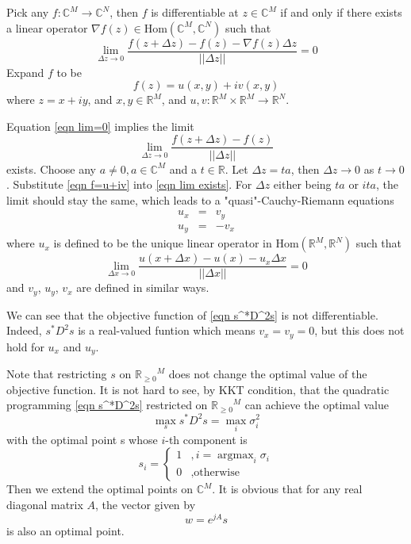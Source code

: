 \documentclass[12pt]{article}
\theoremstyle{remark}
\DeclareMathOperator*{\argmax}{argmax}
\begin{document}
Pick any $f:\mathbb{C}^M\rightarrow\mathbb{C}^N$, then $f$ is differentiable at $z\in\mathbb{C}^M$ if and only if there exists a linear operator $\nabla f(z)\in\mbox{Hom}\left(\mathbb{C}^M,\mathbb{C}^N \right)$ such that
\begin{equation}
	\lim_{\Delta z\rightarrow0}\frac{f(z+\Delta z)-f(z)-\nabla f(z)\Delta z}{||\Delta z||}=0\label{eqn lim=0}
\end{equation}
Expand $f$ to be 
\begin{equation}
	f(z)=u(x,y)+iv(x,y)\label{eqn f=u+iv}
\end{equation}
where $z=x+iy$, and $x,y\in\mathbb{R}^M$, and $u,v:\mathbb{R}^M\times\mathbb{R}^M\rightarrow\mathbb{R}^N$.

Equation \ref{eqn lim=0} implies the limit
\begin{equation}
	\lim_{\Delta z\rightarrow0}\frac{f(z+\Delta z)-f(z)}{||\Delta z||}\label{eqn lim exists}
\end{equation}
exists. Choose any $a\not=0,a\in\mathbb{C}^M$ and a $t\in\mathbb{R}$. Let $\Delta z=ta$, then $\Delta z\rightarrow0$ as $t\rightarrow0$. Substitute \ref{eqn f=u+iv} into \ref{eqn lim exists}. For $\Delta z$ either being $ta$ or $ita$, the limit should stay the same, which leads to a "quasi"-Cauchy-Riemann equations
\begin{eqnarray*}
	u_x&=&v_y\\
	u_y&=&-v_x
\end{eqnarray*}
where $u_x$ is defined to be the unique linear operator in $\mbox{Hom}\left(\mathbb{R}^M,\mathbb{R}^N\right)$ such that
$$\lim_{\Delta x\rightarrow0}\frac{u(x+\Delta x)-u(x)-u_x\Delta x}{||\Delta x||}=0$$
and $v_y$, $u_y$, $v_x$ are defined in similar ways.

We can see that the objective function of \ref{eqn s^*D^2s} is not differentiable. Indeed, $s^*D^2s$ is a real-valued funtion which means $v_x=v_y=0$, but this does not hold for $u_x$ and $u_y$.

Note that restricting $s$ on ${\mathbb{R}_{\geq0}}^M$ does not change the optimal value of the objective function. It is not hard to see, by KKT condition, that the quadratic programming \ref{eqn s^*D^2s} restricted on ${\mathbb{R}_{\geq0}}^M$ can achieve the optimal value $$\max_ss^*D^2s=\max_i \sigma_i^2$$ with the optimal point s whose $i$-th component is
$$
s_i=\left\{ 
\begin{matrix}
	1&,i=\argmax_i\sigma_i\\
	0&,\mbox{otherwise}	
\end{matrix}
\right.
$$
Then we extend the optimal points on $\mathbb{C}^M$. It is obvious that for any real diagonal matrix $A$, the vector given by
$$w=e^{jA}s$$
is also an optimal point.
\end{document}
